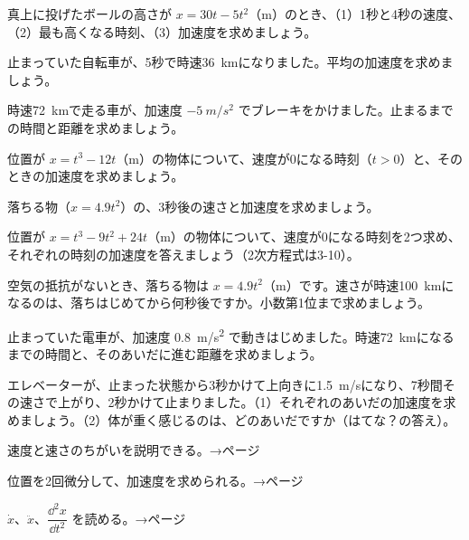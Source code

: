 \bkproblem 真上に投げたボールの高さが $x=30t-5t^2$（m）のとき、（1）1秒と4秒の速度、（2）最も高くなる時刻、（3）加速度を求めましょう。

\bkproblem 止まっていた自転車が、5秒で時速\qty{36}{km}になりました。平均の加速度を求めましょう。

\bkproblem 時速\qty{72}{km}で走る車が、加速度 $\qty{-5}{m/s^2}$ でブレーキをかけました。止まるまでの時間と距離を求めましょう。

\bkproblem 位置が $x=t^3-12t$（m）の物体について、速度が0になる時刻（$t>0$）と、そのときの加速度を求めましょう。

\bkproblem 落ちる物（$x=4.9t^2$）の、3秒後の速さと加速度を求めましょう。


\bkproblem 位置が $x=t^3-9t^2+24t$（m）の物体について、速度が0になる時刻を2つ求め、それぞれの時刻の加速度を答えましょう（2次方程式は3-10）。

\bkproblem 空気の抵抗がないとき、落ちる物は $x=4.9t^2$（m）です。速さが時速\qty{100}{km}になるのは、落ちはじめてから何秒後ですか。小数第1位まで求めましょう。

\bkproblem 止まっていた電車が、加速度 \qty{0.8}{m/s^2} で動きはじめました。時速\qty{72}{km}になるまでの時間と、そのあいだに進む距離を求めましょう。

\bkproblem エレベーターが、止まった状態から3秒かけて上向きに\qty{1.5}{m/s}になり、7秒間その速さで上がり、2秒かけて止まりました。（1）それぞれのあいだの加速度を求めましょう。（2）体が重く感じるのは、どのあいだですか（はてな？の答え）。

\begin{furikaeri}
\begin{checklist}
\item 速度と速さのちがいを説明できる。\hfill{\footnotesize\sffamily\color{bkTheme}→\pageref{bk:5-5:sokudo}ページ}
\item 位置を2回微分して、加速度を求められる。\hfill{\footnotesize\sffamily\color{bkTheme}→\pageref{bk:5-5:nikai}ページ}
\item $\dot{x}$、$\ddot{x}$、$\dfrac{\dd^2x}{\dd t^2}$ を読める。\hfill{\footnotesize\sffamily\color{bkTheme}→\pageref{bk:5-5:nikai}ページ}
\end{checklist}
\end{furikaeri}

